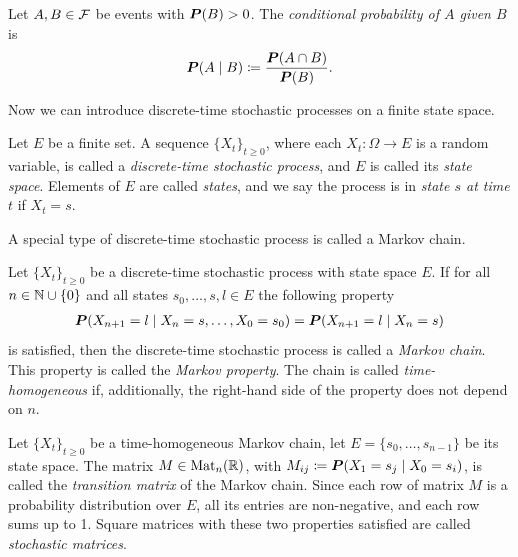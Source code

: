\begin{df}
    Let $A,B\in\mathcal{F}$ be events with $\boldsymbol{P}(B)>0$. The \textit{conditional probability of $A$ given $B$} is 
    \begin{gather*}
        \boldsymbol{P}(A\mid B) \coloneqq \frac{\boldsymbol{P}(A\cap B)}{\boldsymbol{P}(B)}.
    \end{gather*}
\end{df}

Now we can introduce discrete-time stochastic processes on a finite state space. 

\begin{df}
    Let $E$ be a finite set. A sequence $\{X_t\}_{t\geq0}$, where each $X_t:\Omega\to E$ is a random variable, is called a \textit{discrete-time stochastic process}, and $E$ is called its \textit{state space}. Elements of $E$ are called \textit{states}, and we say the process is in \textit{state $s$ at time $t$} if $X_t=s$.
\end{df}


A special type of discrete-time stochastic process is called a Markov chain.

\begin{df}
    Let $\{X_t\}_{t\geq0}$ be a discrete-time stochastic process with state space $E$. If for all $n\in\mathbb{N}\cup\{0\}$ and all states $s_0,\dots, s,l\in E$ the following property 
    \begin{gather*}
        \boldsymbol{P}(X_{n+1}=l\mid X_n=s,\dots, X_0 = s_0) = \boldsymbol{P}(X_{n+1}=l\mid X_n=s)
    \end{gather*}
    is satisfied, then the discrete-time stochastic process is called a \textit{Markov chain}. This property is called the \textit{Markov property}. The chain is called \textit{time-homogeneous} if, additionally, the right-hand side of the property does not depend on $n$.
\end{df}

\begin{df}
    Let $\{X_t\}_{t\geq 0}$ be a time-homogeneous Markov chain, let $E=\{s_0, \dots, s_{n-1}\}$ be its state space. The matrix $M\in\text{Mat}_n(\mathbb{R})$, with $M_{ij} \coloneqq \boldsymbol{P}(X_{1}=s_j\mid X_0=s_i)$, is called the \textit{transition matrix} of the Markov chain. Since each row of matrix $M$ is a probability distribution over $E$, all its entries are non-negative, and each row sums up to 1. Square matrices with these two properties satisfied are called \textit{stochastic matrices}.
\end{df}


